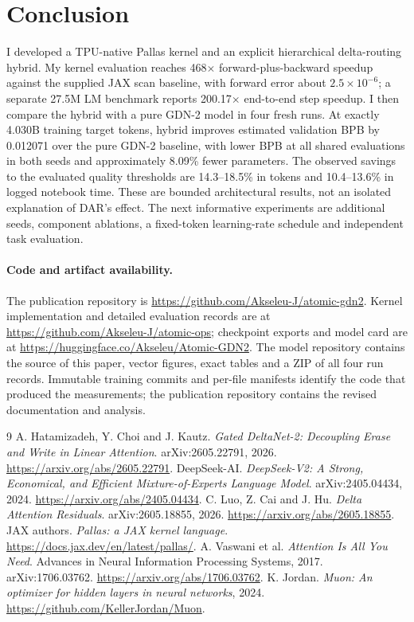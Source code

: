 \documentclass[10pt,a4paper]{article}
\newcommand{\repo}{\url{https://github.com/Akseleu-J/atomic-gdn2}}
\begin{document}
\section{Conclusion}
I developed a TPU-native Pallas kernel and an explicit hierarchical delta-routing hybrid.
My kernel evaluation reaches 468$\times$ forward-plus-backward speedup against the supplied
JAX scan baseline, with forward error about $2.5\times10^{-6}$; a separate 27.5M LM
benchmark reports 200.17$\times$ end-to-end step speedup. I then compare the hybrid
with a pure GDN-2 model in four fresh runs. At exactly 4.030B training
target tokens, hybrid improves estimated validation BPB by 0.012071 over the pure GDN-2
baseline, with lower BPB at all shared evaluations in both seeds and approximately
8.09\% fewer parameters. The observed savings to the evaluated quality thresholds are
14.3--18.5\% in tokens and 10.4--13.6\% in logged notebook time.
These are bounded architectural results, not an isolated explanation of DAR's effect.
The next informative experiments are additional seeds, component ablations, a fixed-token
learning-rate schedule and independent task evaluation.

\paragraph{Code and artifact availability.}
The publication repository is \repo. Kernel implementation and detailed evaluation
records are at \url{https://github.com/Akseleu-J/atomic-ops}; checkpoint exports and model
card are at \url{https://huggingface.co/Akseleu/Atomic-GDN2}. The model repository contains
the source of this paper, vector figures, exact tables and a ZIP of all four run records.
Immutable training commits and per-file manifests identify the code that produced
the measurements; the publication repository contains the revised documentation and analysis.

\begin{thebibliography}{9}
 A. Hatamizadeh, Y. Choi and J. Kautz.
\emph{Gated DeltaNet-2: Decoupling Erase and Write in Linear Attention}. arXiv:2605.22791, 2026.
\url{https://arxiv.org/abs/2605.22791}.
 DeepSeek-AI. \emph{DeepSeek-V2: A Strong, Economical, and Efficient
Mixture-of-Experts Language Model}. arXiv:2405.04434, 2024. \url{https://arxiv.org/abs/2405.04434}.
 C. Luo, Z. Cai and J. Hu. \emph{Delta Attention Residuals}.
arXiv:2605.18855, 2026. \url{https://arxiv.org/abs/2605.18855}.
 JAX authors. \emph{Pallas: a JAX kernel language}.
\url{https://docs.jax.dev/en/latest/pallas/}.
 A. Vaswani et al. \emph{Attention Is All You Need}.
Advances in Neural Information Processing Systems, 2017. arXiv:1706.03762.
\url{https://arxiv.org/abs/1706.03762}.
 K. Jordan. \emph{Muon: An optimizer for hidden layers in neural networks}, 2024.
\url{https://github.com/KellerJordan/Muon}.
\end{thebibliography}
\end{document}
